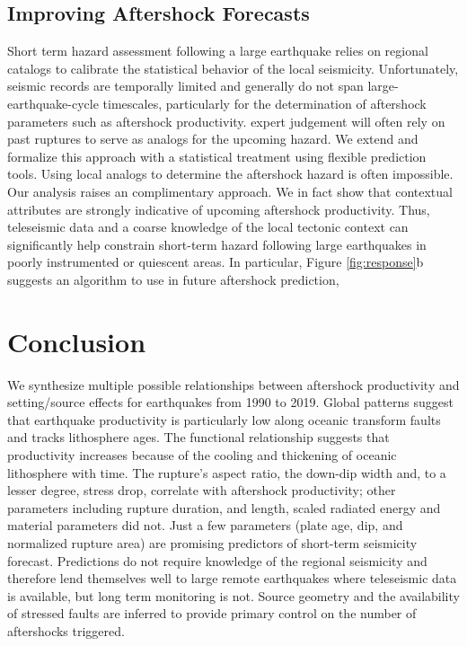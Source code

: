 \documentclass[draft, jgrga]{agujournal2018}
\begin{document}
\subsection{Improving Aftershock Forecasts}

Short term hazard assessment following a large earthquake relies on regional catalogs to calibrate the statistical behavior of the local seismicity. Unfortunately, seismic records are temporally limited and generally do not span large-earthquake-cycle timescales, particularly for the determination of aftershock parameters such as aftershock productivity.  expert judgement will often rely on past ruptures to serve as analogs for the upcoming hazard. We extend and formalize this approach with a statistical treatment using flexible prediction tools. Using local analogs to determine the aftershock hazard is often impossible. Our analysis raises an complimentary approach. We in fact show that contextual attributes are strongly indicative of upcoming aftershock productivity. Thus, teleseismic data and a coarse knowledge of the local tectonic context can significantly help constrain short-term hazard following large earthquakes in poorly instrumented or quiescent areas. In particular, Figure \ref{fig:response}b suggests an algorithm to use in future aftershock prediction, 

\section{Conclusion}

We synthesize multiple possible relationships between aftershock productivity and setting/source effects for earthquakes from 1990 to 2019. Global patterns suggest that earthquake productivity is particularly low along oceanic transform faults and tracks lithosphere ages. The functional relationship suggests that productivity increases because of the cooling and thickening of oceanic lithosphere with time. The rupture's aspect ratio, the down-dip width and, to a lesser degree, stress drop, correlate with aftershock productivity; other parameters including rupture duration, and length, scaled radiated energy and material parameters did not. Just a few parameters (plate age, dip, and normalized rupture area) are promising predictors of short-term seismicity forecast. Predictions do not require knowledge of the regional seismicity and therefore lend themselves well to large remote earthquakes where teleseismic data is available, but long term monitoring is not. Source geometry and the availability of stressed faults are inferred to provide primary control on the number of aftershocks triggered.
\end{document}
